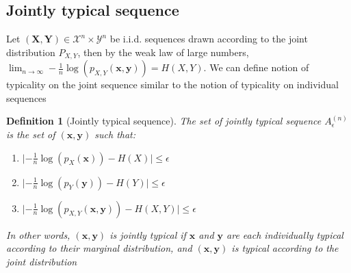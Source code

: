 \documentclass{article}
\newcommand{\norm}[1]{\vert {#1} \vert}
\newtheorem{definition}{Definition}[section]
\begin{document}
    \subsection{Jointly typical sequence}
    Let $(\mathbf{X}, \mathbf{Y}) \in \mathcal{X}^n \times \mathcal{Y}^n$ be i.i.d. sequences drawn according to the joint distribution $P_{X, Y}$, then by the weak law of large numbers, $\lim_{n \rightarrow \infty}-\frac{1}{n}\log(p_{X, Y}(\mathbf{x}, \mathbf{y})) = H(X, Y)$. We can define notion of typicality on the joint sequence similar to the notion of typicality on individual sequences

    \begin{definition}[Jointly typical sequence]
        The set of jointly typical sequence $A_\epsilon^{(n)}$ is the set of $(\mathbf{x}, \mathbf{y})$ such that:

        \begin{enumerate}
            \item $\norm{-\frac{1}{n}\log(p_X(\mathbf{x})) - H(X)} \leq \epsilon$
            \item $\norm{-\frac{1}{n}\log(p_Y(\mathbf{y})) - H(Y)} \leq \epsilon$
            \item $\norm{
                -\frac{1}{n}\log(p_{X, Y}(\mathbf{x}, \mathbf{y})) - H(X, Y)
            } \leq \epsilon$
        \end{enumerate}

        In other words, $(\mathbf{x}, \mathbf{y})$ is jointly typical if $\mathbf{x}$ and $\mathbf{y}$ are each individually typical according to their marginal distribution, and $(\mathbf{x}, \mathbf{y})$ is typical according to the joint distribution
    \end{definition}
\end{document}
